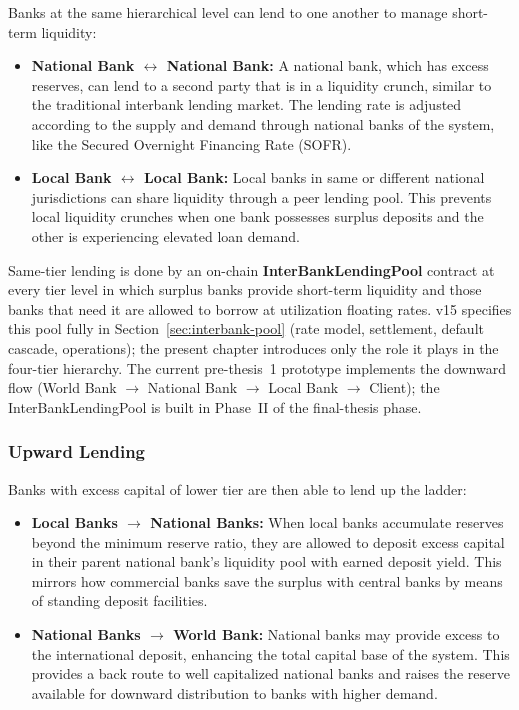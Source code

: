 \documentclass[12pt,a4paper]{report}
\begin{document}
Banks at the same hierarchical level can lend to one another to manage short-term liquidity:

\begin{itemize}[noitemsep]
\item \textbf{National Bank $\leftrightarrow$ National Bank:} A national bank, which has excess reserves, can lend to a second party that is in a liquidity crunch, similar to the traditional interbank lending market. The lending rate is adjusted according to the supply and demand through national banks of the system, like the Secured Overnight Financing Rate (SOFR).
\item \textbf{Local Bank $\leftrightarrow$ Local Bank:} Local banks in same or different national jurisdictions can share liquidity through a peer lending pool. This prevents local liquidity crunches when one bank possesses surplus deposits and the other is experiencing elevated loan demand.
\end{itemize}

Same-tier lending is done by an on-chain \textbf{InterBankLendingPool} contract at every tier level in which surplus banks provide short-term liquidity and those banks that need it are allowed to borrow at utilization floating rates. v15 specifies this pool fully in Section~\ref{sec:interbank-pool} (rate model, settlement, default cascade, operations); the present chapter introduces only the role it plays in the four-tier hierarchy. The current pre-thesis~1 prototype implements the downward flow (World Bank $\to$ National Bank $\to$ Local Bank $\to$ Client); the InterBankLendingPool is built in Phase~II of the final-thesis phase.

\subsubsection{Upward Lending}

Banks with excess capital of lower tier are then able to lend up the ladder:

\begin{itemize}[noitemsep]
\item \textbf{Local Banks $\to$ National Banks:} When local banks accumulate reserves beyond the minimum reserve ratio, they are allowed to deposit excess capital in their parent national bank's liquidity pool with earned deposit yield. This mirrors how commercial banks save the surplus with central banks by means of standing deposit facilities.
\item \textbf{National Banks $\to$ World Bank:} National banks may provide excess to the international deposit, enhancing the total capital base of the system. This provides a back route to well capitalized national banks and raises the reserve available for downward distribution to banks with higher demand.
\end{itemize}
\end{document}
